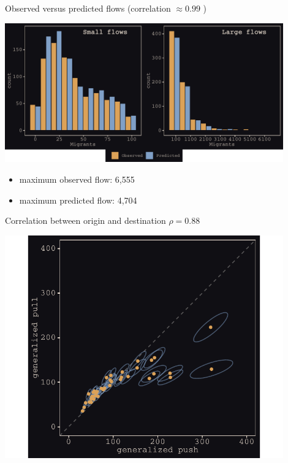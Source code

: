 \documentclass{beamer}
\begin{document}
\begin{frame}{Observed versus predicted flows (correlation $\approx 0.99$ )}
\begin{center}
	\includegraphics[width=0.9\textwidth]{../../fig/hist_fit}      
\end{center}
\begin{itemize}
	\item \alert{maximum} observed flow: 6,555
	\item \alert{maximum} predicted flow: 4,704
\end{itemize}
\end{frame}

\begin{frame}{Correlation between origin and destination $\rho = 0.88$}
				\begin{center}
		\includegraphics[width=0.9\textwidth]{../../fig/scatter}
	\end{center}
\end{frame}
\end{document}
